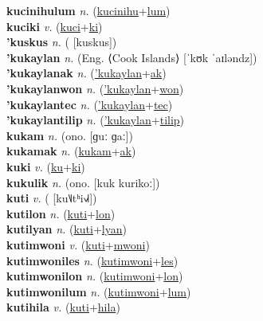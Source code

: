 \textbf{kucinihulum} \textit{n.} (\hyperref[kucinihu]{kucinihu}+\hyperref[lum]{lum})
 \label{kucinihulum} \\
\textbf{kuciki} \textit{v.} (\hyperref[kuci]{kuci}+\hyperref[ki]{ki})
 \label{kuciki} \\
\textbf{'kuskus} \textit{n.} ( [kuskus])
 \label{'kuskus} \\
\textbf{'kukaylan} \textit{n.} (Eng. ⟨Cook Islands⟩ [ˈkʊk ˈaɪləndz])
 \label{'kukaylan} \\
\textbf{'kukaylanak} \textit{n.} (\hyperref['kukaylan]{'kukaylan}+\hyperref[ak]{ak})
 \label{'kukaylanak} \\
\textbf{'kukaylanwon} \textit{n.} (\hyperref['kukaylan]{'kukaylan}+\hyperref[won]{won})
 \label{'kukaylanwon} \\
\textbf{'kukaylantec} \textit{n.} (\hyperref['kukaylan]{'kukaylan}+\hyperref[tec]{tec})
 \label{'kukaylantec} \\
\textbf{'kukaylantilip} \textit{n.} (\hyperref['kukaylan]{'kukaylan}+\hyperref[tilip]{tilip})
 \label{'kukaylantilip} \\
\textbf{kukam} \textit{n.} (ono. [ɡuː ɡaː])
 \label{kukam} \\
\textbf{kukamak} \textit{n.} (\hyperref[kukam]{kukam}+\hyperref[ak]{ak})
 \label{kukamak} \\
\textbf{kuki} \textit{v.} (\hyperref[ku]{ku}+\hyperref[ki]{ki})
 \label{kuki} \\
\textbf{kukulik} \textit{n.} (ono. [kuk kurikoː])
 \label{kukulik} \\
\textbf{kuti} \textit{v.} ( [ku˥˩tʰi˧˩˧])
 \label{kuti} \\
\textbf{kutilon} \textit{n.} (\hyperref[kuti]{kuti}+\hyperref[lon]{lon})
 \label{kutilon} \\
\textbf{kutilyan} \textit{n.} (\hyperref[kuti]{kuti}+\hyperref[lyan]{lyan})
 \label{kutilyan} \\
\textbf{kutimwoni} \textit{v.} (\hyperref[kuti]{kuti}+\hyperref[mwoni]{mwoni})
 \label{kutimwoni} \\
\textbf{kutimwoniles} \textit{n.} (\hyperref[kutimwoni]{kutimwoni}+\hyperref[les]{les})
 \label{kutimwoniles} \\
\textbf{kutimwonilon} \textit{n.} (\hyperref[kutimwoni]{kutimwoni}+\hyperref[lon]{lon})
 \label{kutimwonilon} \\
\textbf{kutimwonilum} \textit{n.} (\hyperref[kutimwoni]{kutimwoni}+\hyperref[lum]{lum})
 \label{kutimwonilum} \\
\textbf{kutihila} \textit{v.} (\hyperref[kuti]{kuti}+\hyperref[hila]{hila})
